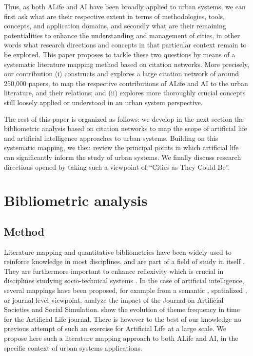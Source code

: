 \documentclass[letterpaper]{article}
\begin{document}
Thus, as both ALife and AI have been broadly applied to urban systems, we can first ask what are their respective extent in terms of methodologies, tools, concepts, and application domains, and secondly what are their remaining potentialities to enhance the understanding and management of cities, in other words what research directions and concepts in that particular context remain to be explored. This paper proposes to tackle these two questions by means of a systematic literature mapping method based on citation networks. More precisely, our contribution (i) constructs and explores a large citation network of around 250,000 papers, to map the respective contributions of ALife and AI to the urban literature, and their relations; and (ii) explores more thoroughly crucial concepts still loosely applied or understood in an urban system perspective.


The rest of this paper is organized as follows: we develop in the next section the bibliometric analysis based on citation networks to map the scope of artificial life and artificial intelligence approaches to urban systems. Building on this systematic mapping, we then review the principal points in which artificial life can significantly inform the study of urban systems. We finally discuss research directions opened by taking such a viewpoint of ``Cities as They Could Be''.


\section{Bibliometric analysis}

\subsection{Method}


Literature mapping and quantitative bibliometrics have been widely used to reinforce knowledge in most disciplines, and are part of a field of study in itself \cite{leydesdorff2001challenge}. They are furthermore important to enhance reflexivity which is crucial in disciplines studying socio-technical systems \cite{raimbault2019empowering}. In the case of artificial intelligence, several mappings have been proposed, for example from a semantic \citep{van1993neural}, spatialized \citep{niu2016global}, or journal-level \citep{ibanez2011using} viewpoint. \cite{squazzoni2013social} analyze the impact of the Journal on Artificial Societies and Social Simulation. \cite{aguilar2014past} show the evolution of theme frequency in time for the Artificial Life journal. There is however to the best of our knowledge no previous attempt of such an exercise for Artificial Life at a large scale. We propose here such a literature mapping approach to both ALife and AI, in the specific context of urban systems applications.
\end{document}
